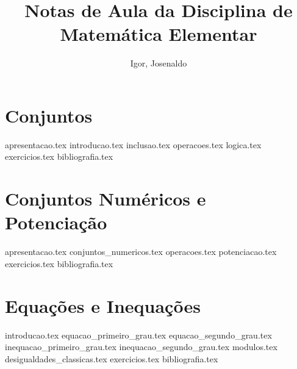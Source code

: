 \documentclass[a4paper,12pt, oneside]{book}
\begin{document}
    \title{Notas de Aula da Disciplina de Matemática Elementar}
    \author{Igor, Josenaldo} %

    \frontmatter %
    \maketitle
    \tableofcontents

    \mainmatter %

    \chapter{Conjuntos}
    {apresentacao.tex}
    {introducao.tex}
    {inclusao.tex}
    {operacoes.tex}
    {logica.tex}
    {exercicios.tex}
    {bibliografia.tex} %

    \chapter{Conjuntos Numéricos e Potenciação}    
    {apresentacao.tex}
    {conjuntos_numericos.tex}
    {operacoes.tex}
    {potenciacao.tex}
    {exercicios.tex}
    {bibliografia.tex} %

    \chapter{Equações e Inequações}
    {introducao.tex}
    {equacao_primeiro_grau.tex}
    {equacao_segundo_grau.tex}
    {inequacao_primeiro_grau.tex}
    {inequacao_segundo_grau.tex}
    {modulos.tex}
    {desigualdades_classicas.tex}
    {exercicios.tex}
    {bibliografia.tex} %
\end{document}
